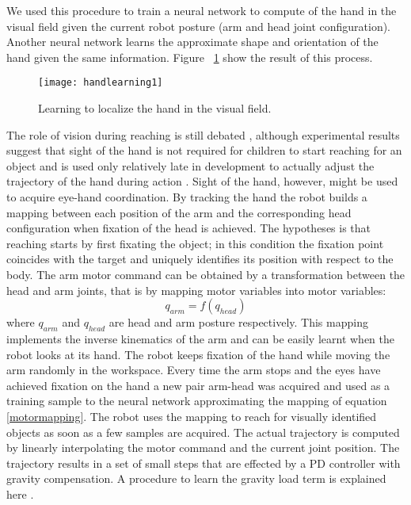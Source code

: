 We used this procedure to train a neural network to compute of the hand in the visual field given the current robot posture (arm and head joint configuration). Another neural network learns the approximate shape and orientation of the hand given the same information. Figure ~\ref{sec-handlearning1} show the result of this process. 

\begin{figure}
\centering
\texttt{[image: handlearning1]}
\caption{Learning to localize the hand in the visual field.}
\label{sec-handlearning1}
\end{figure}

The role of vision during reaching is still debated \cite{saunders03humans}, although experimental results suggest that sight of the hand is not required for children to start reaching for an object \cite{clifton93isvisually,clifton94multimodal} and is used only relatively late in development to actually adjust the trajectory of the hand during action \cite{ashmead93visual}. 
Sight of the hand, however, might be used to acquire eye-hand coordination. By tracking the hand the robot builds a mapping between each position of the arm and the corresponding head configuration when fixation of the head is achieved. The hypotheses is that reaching starts by first fixating the object; in this condition the fixation point coincides with the target and uniquely identifies its position with respect to the body. The arm motor command can be obtained by a transformation between the head and arm joints, that is by mapping motor variables into motor variables:
\begin{equation}q_{arm}=f(q_{head})\label{motormapping}\end{equation}
where $q_{arm}$ and $q_{head}$ are head and arm posture respectively. This mapping implements the inverse kinematics of the arm and can be easily learnt when the robot looks at its hand. The robot keeps fixation of the hand while moving the arm randomly in the workspace. Every time the arm stops and the eyes have achieved fixation on the hand a new pair arm-head was acquired and used as a training sample to the neural network approximating the mapping of equation \ref{motormapping}. The robot uses the mapping to reach for visually identified objects as soon as a few samples are acquired.
The actual trajectory is computed by linearly interpolating the motor command and the current joint position. The trajectory results in a set of small steps that are effected by a PD controller with gravity compensation. A procedure to learn the gravity load term is explained here \cite{natale04thesis}.
